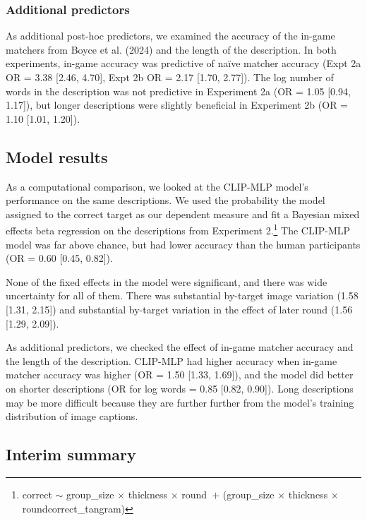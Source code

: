 \documentclass[10pt, letterpaper]{article}
\begin{document}
\subsubsection{Additional predictors}\label{additional-predictors}

As additional post-hoc predictors, we examined the accuracy of the
in-game matchers from Boyce et al. (2024) and the length of the
description. In both experiments, in-game accuracy was predictive of
naïve matcher accuracy (Expt 2a OR = 3.38 {[}2.46, 4.70{]}, Expt 2b OR =
2.17 {[}1.70, 2.77{]}). The log number of words in the description was
not predictive in Experiment 2a (OR = 1.05 {[}0.94, 1.17{]}), but longer
descriptions were slightly beneficial in Experiment 2b (OR = 1.10
{[}1.01, 1.20{]}).

\subsection{Model results}\label{model-results}

As a computational comparison, we looked at the CLIP-MLP model's
performance on the same descriptions. We used the probability the model
assigned to the correct target as our dependent measure and fit a
Bayesian mixed effects beta regression on the descriptions from
Experiment 2.\footnote{correct \({\sim}\) group\_size \({\times}\)
  thickness \({\times}\) round~\({+}\) (group\_size \({\times}\)
  thickness \({\times}\) round\textbar correct\_tangram)} The CLIP-MLP
model was far above chance, but had lower accuracy than the human
participants (OR = 0.60 {[}0.45, 0.82{]}).

None of the fixed effects in the model were significant, and there was
wide uncertainty for all of them. There was substantial by-target image
variation (1.58 {[}1.31, 2.15{]}) and substantial by-target variation in
the effect of later round (1.56 {[}1.29, 2.09{]}).

As additional predictors, we checked the effect of in-game matcher
accuracy and the length of the description. CLIP-MLP had higher accuracy
when in-game matcher accuracy was higher (OR = 1.50 {[}1.33, 1.69{]}),
and the model did better on shorter descriptions (OR for log words =
0.85 {[}0.82, 0.90{]}). Long descriptions may be more difficult because
they are further further from the model's training distribution of image
captions.

\subsection{Interim summary}\label{interim-summary}
\end{document}
